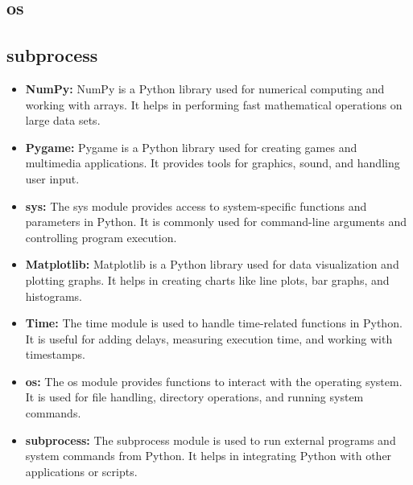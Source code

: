 \documentclass{article}
\begin{document}
\subsection{os}
\subsection{subprocess}
\begin{itemize}

\item \textbf{NumPy:} NumPy\cite{numpy_docs} is a Python library used for numerical computing and working with arrays. It helps in performing fast mathematical operations on large data sets.

\item \textbf{Pygame:} Pygame\cite{pygame_docs} is a Python library used for creating games and multimedia applications. It provides tools for graphics, sound, and handling user input.

\item \textbf{sys:} The sys module provides access to system-specific functions and parameters in Python. It is commonly used for command-line arguments and controlling program execution.

\item \textbf{Matplotlib:} Matplotlib\cite{matplotlib_docs} is a Python library used for data visualization and plotting graphs. It helps in creating charts like line plots, bar graphs, and histograms.

\item \textbf{Time:} The time module is used to handle time-related functions in Python. It is useful for adding delays, measuring execution time, and working with timestamps.

\item \textbf{os:} The os module provides functions to interact with the operating system. It is used for file handling, directory operations, and running system commands.

\item \textbf{subprocess:} The subprocess module is used to run external programs and system commands from Python. It helps in integrating Python with other applications or scripts.

\end{itemize}
\end{document}
